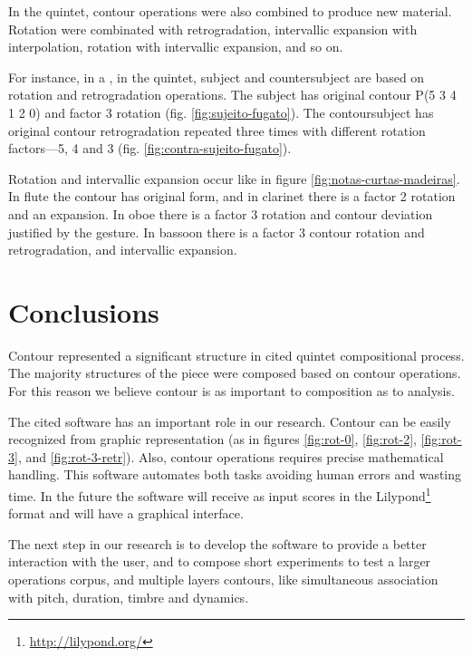In the quintet, contour operations were also combined to produce new
material. Rotation were combinated with retrogradation, intervallic
expansion with interpolation, rotation with intervallic expansion, and
so on.

For instance, in a , in the quintet, subject and
countersubject are based on rotation and retrogradation
operations. The subject has original contour P(5 3 4 1 2 0) and factor
3 rotation (fig. \ref{fig:sujeito-fugato}). The contoursubject has
original contour retrogradation repeated three times with different
rotation factors---5, 4 and 3 (fig. \ref{fig:contra-sujeito-fugato}).

Rotation and intervallic expansion occur like in figure
\ref{fig:notas-curtas-madeiras}. In flute the contour has original
form, and in clarinet there is a factor 2 rotation and an
expansion. In oboe there is a factor 3 rotation and contour deviation
justified by the gesture. In bassoon there is a factor 3 contour
rotation and retrogradation, and intervallic expansion.

\section{Conclusions}
\label{sec:conclusions}


Contour represented a significant structure in cited quintet
compositional process. The majority structures of the piece were
composed based on contour operations. For this reason we believe
contour is as important to composition as to analysis. 

The cited software has an important role in our research. Contour can
be easily recognized from graphic representation (as in figures
\ref{fig:rot-0}, \ref{fig:rot-2}, \ref{fig:rot-3}, and
\ref{fig:rot-3-retr}). Also, contour operations requires precise
mathematical handling. This software automates both tasks avoiding
human errors and wasting time. In the future the software will receive
as input scores in the Lilypond\footnote{\url{http://lilypond.org/}}
format and will have a graphical interface.

The next step in our research is to develop the software to provide a
better interaction with the user, and to compose short experiments to
test a larger operations corpus, and multiple layers contours, like
simultaneous association with pitch, duration, timbre and dynamics.

